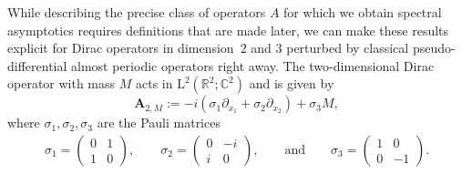 \documentclass[10pt]{amsart}
\theoremstyle{definition}\newtheorem{defi}[theo]{Definition}\newtheorem{rema}[theo]{Remark}\newtheorem{exam}[theo]{Example}\newtheorem{nota}[theo]{Notation}
\newcommand{\RL}{\mathrm{L}}
\newcommand{\R}{\mathbb R}
\newcommand{\C}{\mathbb C}
\newcommand{\BA}{\mathbf A}
\newcommand{\del}{\partial}
\begin{document}
While describing the precise class of operators $A$ for which we obtain spectral asymptotics requires definitions that are made later, we can make these results explicit for Dirac operators in dimension~$2$ and $3$ perturbed by classical pseudo-differential almost periodic operators right away. The two-dimensional Dirac operator with mass $M$ acts in $\RL^2(\R^2;\C^2)$ and is given by
\begin{equation}
\BA_{2,M} := -i(\sigma_1 \del_{x_1} + \sigma_2 \del_{x_2}) + \sigma_3 M,
\end{equation}
where $\sigma_1, \sigma_2,
\sigma_3$ are the Pauli matrices
\begin{align}
\sigma_1=
\begin{pmatrix}
0 & 1\\
1 & 0
\end{pmatrix},\qquad
\sigma_2=
\begin{pmatrix}
0 & -i\\
i & 0
\end{pmatrix},\qquad \text{and} \qquad
\sigma_3=
\begin{pmatrix}
1 & 0\\
0 & -1
\end{pmatrix}.
\end{align}
\end{document}
